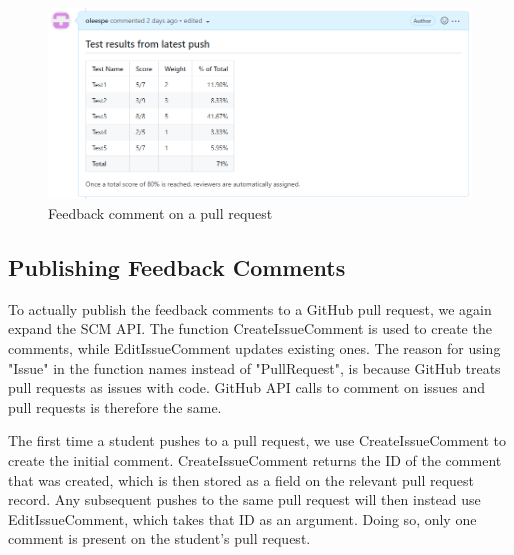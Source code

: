 \begin{figure}[ht]
    \centering
    \includegraphics[width=\textwidth]{photos/feedback-comment.PNG}
    \caption{Feedback comment on a pull request}
    \label{fig:feedback-comment}
\end{figure}

\subsection{Publishing Feedback Comments}

To actually publish the feedback comments to a GitHub pull request, we again expand the SCM API.
The function CreateIssueComment is used to create the comments, while EditIssueComment updates existing ones.
The reason for using "Issue" in the function names instead of "PullRequest", is because GitHub treats pull requests as issues with code.
GitHub API calls to comment on issues and pull requests is therefore the same.

The first time a student pushes to a pull request, we use CreateIssueComment to create the initial comment.
CreateIssueComment returns the ID of the comment that was created, which is then stored as a field on the relevant pull request record.
Any subsequent pushes to the same pull request will then instead use EditIssueComment, which takes that ID as an argument.
Doing so, only one comment is present on the student's pull request.